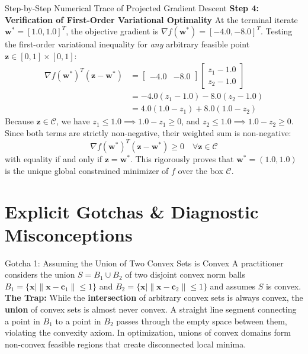 \begin{examplebox}[breakable]{Step-by-Step Numerical Trace of Projected Gradient Descent}
\textbf{Step 4: Verification of First-Order Variational Optimality}
At the terminal iterate $\mathbf{w}^* = [1.0, 1.0]^T$, the objective gradient is $\nabla f(\mathbf{w}^*) = [-4.0, -8.0]^T$.
Testing the first-order variational inequality for \emph{any} arbitrary feasible point $\mathbf{z} \in [0, 1] \times [0, 1]$:
\begin{align}
\nabla f(\mathbf{w}^*)^T (\mathbf{z} - \mathbf{w}^*) &= \begin{bmatrix} -4.0 & -8.0 \end{bmatrix} \begin{bmatrix} z_1 - 1.0 \\ z_2 - 1.0 \end{bmatrix} \nonumber \\
&= -4.0(z_1 - 1.0) - 8.0(z_2 - 1.0) \nonumber \\
&= 4.0(1.0 - z_1) + 8.0(1.0 - z_2)
\end{align}
Because $\mathbf{z} \in \mathcal{C}$, we have $z_1 \le 1.0 \implies 1.0 - z_1 \ge 0$, and $z_2 \le 1.0 \implies 1.0 - z_2 \ge 0$.
Since both terms are strictly non-negative, their weighted sum is non-negative:
\begin{equation}
\nabla f(\mathbf{w}^*)^T (\mathbf{z} - \mathbf{w}^*) \ge 0 \quad \forall \mathbf{z} \in \mathcal{C}
\end{equation}
with equality if and only if $\mathbf{z} = \mathbf{w}^*$. This rigorously proves that $\mathbf{w}^* = (1.0, 1.0)$ is the unique global constrained minimizer of $f$ over the box $\mathcal{C}$.
\end{examplebox}

\section{Explicit Gotchas \& Diagnostic Misconceptions}

\begin{trapbox}{Gotcha 1: Assuming the Union of Two Convex Sets is Convex}
A practitioner considers the union $S = B_1 \cup B_2$ of two disjoint convex norm balls $B_1 = \{\mathbf{x} \mid \|\mathbf{x} - \mathbf{c}_1\| \le 1\}$ and $B_2 = \{\mathbf{x} \mid \|\mathbf{x} - \mathbf{c}_2\| \le 1\}$ and assumes $S$ is convex.
\tcblower
\textbf{The Trap:} While the \textbf{intersection} of arbitrary convex sets is always convex, the \textbf{union} of convex sets is almost never convex. A straight line segment connecting a point in $B_1$ to a point in $B_2$ passes through the empty space between them, violating the convexity axiom. In optimization, unions of convex domains form non-convex feasible regions that create disconnected local minima.
\end{trapbox}

